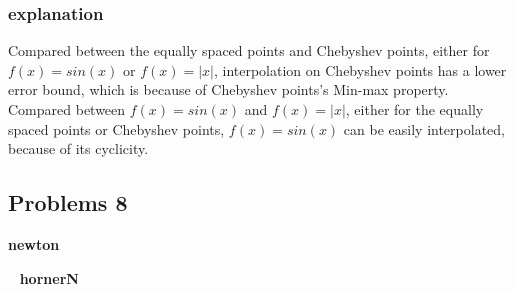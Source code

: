 \documentclass[11pt,fleqn]{exam}
\begin{document}
\subsubsection*{explanation}
Compared between the equally spaced points and Chebyshev points, either for $f(x) = sin(x)$ or $f(x) = |x|$, interpolation on Chebyshev points has a lower error bound, which is because of Chebyshev points's Min-max property.\\
Compared between $f(x) = sin(x)$ and $f(x) = |x|$, either for the equally spaced points or Chebyshev points, $f(x) = sin(x)$ can be easily interpolated, because of its cyclicity.

\subsection*{Problems 8}
\textbf{newton}


~\newline
\textbf{hornerN}

\end{document}
